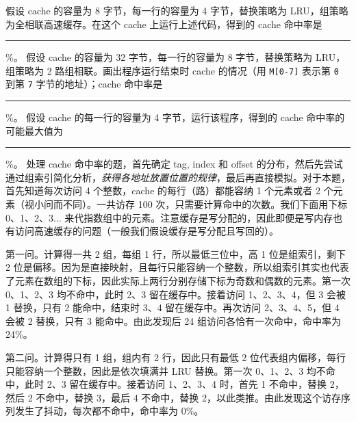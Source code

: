 \begin{problems}
        \qn 假设 cache 的容量为 8 字节，每一行的容量为 4 字节，替换策略为 LRU，组策略为全相联高速缓存。在这个 cache 上运行上述代码，得到的 cache 命中率是 \rule{2.5cm}{0.25mm}\%。
        \qn 假设 cache 的容量为 32 字节，每一行的容量为 8 字节，替换策略为 LRU，组策略为 2 路组相联。画出程序运行结束时 cache 的情况（用 \verb|M[0-7]| 表示第 \verb|0| 到第 \verb|7| 字节的地址）；cache 命中率是 \rule{2.5cm}{0.25mm}\%。
        \qn 假设 cache 的每一行的容量为 4 字节，运行该程序，得到的 cache 命中率的可能最大值为 \rule{2.5cm}{0.25mm}\%。
        \sol 处理 cache 命中率的题，首先确定 tag, index 和 offset 的分布，然后先尝试通过组索引简化分析，\emph{获得各地址放置位置的规律}，最后再直接模拟。对于本题，首先知道每次访问 4 个整数，cache 的每行（路）都能容纳 1 个元素或者 2 个元素（视小问而不同）。一共访存 100 次，只需要计算命中的次数。我们下面用下标 0、1、2、3... 来代指数组中的元素。注意缓存是写分配的，因此即便是写内存也有访问高速缓存的问题（一般我们假设缓存是写分配且写回的）。

        第一问。计算得一共 2 组，每组 1 行，所以最低三位中，高 1 位是组索引，剩下 2 位是偏移。因为是直接映射，且每行只能容纳一个整数，所以组索引其实也代表了元素在数组的下标，因此实际上两行分别存储下标为奇数和偶数的元素。第一次 0、1、2、3 均不命中，此时 2、3 留在缓存中。接着访问 1、2、3、4，但 3 会被 1 替换，只有 2 能命中，结束时 3、4 留在缓存中。再次访问 2、3、4、5，但 4 会被 2 替换，只有 3 能命中。由此发现后 24 组访问各恰有一次命中，命中率为 24\%。

        第二问。计算得只有 1 组，组内有 2 行，因此只有最低 2 位代表组内偏移，每行只能容纳一个整数，因此是依次填满并 LRU 替换。第一次 0、1、2、3 均不命中，此时 2、3 留在缓存中。接着访问 1、2、3、4 时，首先 1 不命中，替换 2，然后 2 不命中，替换 3，最后 4 不命中，替换 2，以此类推。由此发现这个访存序列发生了抖动，每次都不命中，命中率为 0\%。


\end{problems}
